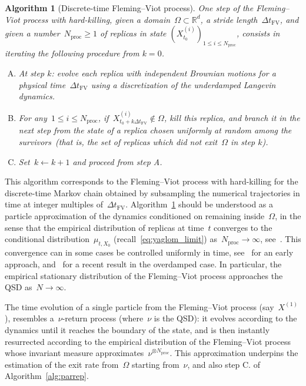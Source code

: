 \documentclass[a4]{article}
\newcommand{\R}{\mathbb{R}}
\newcommand{\1}{\mathbbm 1}
\newtheorem{algorithm}{Algorithm}
\begin{document}
\begin{algorithm}[Discrete-time Fleming--Viot process]
    \label{alg:fv}
    One step of the Fleming--Viot process with hard-killing, given a domain~$\Omega\subset\R^d$, a stride length~$\Delta t_{\mathrm{FV}}$, and given a number~$N_{\mathrm{proc}}\geq 1$ of replicas in state $(X_{t_0}^{(i)})_{1\leq i\leq N_{\mathrm{proc}}}$, consists in iterating the following procedure from $k=0$.
    \begin{enumerate}[A.]
        \item{At step $k$: evolve each replica with independent Brownian motions for a physical time~$\Delta t_{\mathrm{FV}}$ using a discretization of the underdamped Langevin dynamics.}
        \item{For any~$1\leq i\leq N_{\mathrm{proc}}$, if~$X_{t_0 + k\Delta t_{\mathrm{FV}}}^{(i)}\not\in\Omega$, kill this replica, and branch it in the next step from the state of a replica chosen uniformly at random among the survivors~(that is, the set of replicas which did not exit~$\Omega$ in step $k$).}
        \item{Set~$k\leftarrow k+1$ and proceed from step A.}
    \end{enumerate}
\end{algorithm}
This algorithm corresponds to the Fleming--Viot process with hard-killing for the discrete-time Markov chain obtained by subsampling the numerical trajectories in time at integer multiples of~$\Delta t_{\mathrm{FV}}$.
Algorithm~\ref{alg:fv} should be understood as a particle approximation of the dynamics conditioned on remaining inside~$\Omega$, in the sense that the empirical distribution of replicas at time~$t$ converges to the conditional distribution~$\mu_{t,X_0}$ (recall~\eqref{eq:yaglom_limit}) as~$N_{\mathrm{proc}}\to \infty$, see~\cite[Theorem 2.2]{V14}. This convergence can in some cases be controlled uniformly in time, see~\cite[Theorem 3.1]{R06} for an early approach, and~\cite[Theorem 2]{JM22} for a recent result in the overdamped case.
In particular, the empirical stationary distribution of the Fleming--Viot process approaches the QSD as~$N\to\infty$.

The time evolution of a single particle from the Fleming--Viot process (say~$X^{(1)}$), resembles a~$\nu$-return process (where~$\nu$ is the QSD): it evolves according to the dynamics until it reaches the boundary of the state, and is then instantly resurrected according to the empirical distribution of the Fleming--Viot process whose invariant measure approximates~$\nu^{\otimes N_{\mathrm{proc}}}$.
This approximation underpins the estimation of the exit rate from~$\Omega$ starting from~$\nu$, and also step C. of Algorithm~\ref{alg:parrep}.
\end{document}
